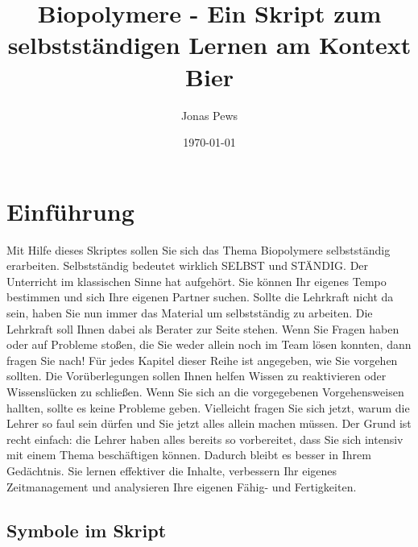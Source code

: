 \documentclass{scrartcl}  %
\author{Jonas Pews}
\title{Biopolymere - Ein Skript zum selbstständigen Lernen am Kontext Bier}
\date{\today}
\begin{document}
	\maketitle
	
	\begin{center}
		\ccbyncsa
	\end{center}
	

\pagebreak

	\renewcommand{\contentsname}{Inhaltsverzeichnis}  %
	\tableofcontents

\pagebreak

	\section{Einführung}

		Mit Hilfe dieses Skriptes sollen Sie sich das Thema Biopolymere selbstständig erarbeiten. Selbstständig bedeutet wirklich SELBST und STÄNDIG. Der Unterricht im klassischen Sinne hat aufgehört. Sie können Ihr eigenes Tempo bestimmen und sich Ihre eigenen Partner suchen. Sollte die Lehrkraft nicht da sein, haben Sie nun immer das Material um selbstständig zu arbeiten.
		Die Lehrkraft soll Ihnen dabei als Berater zur Seite stehen. Wenn Sie Fragen haben oder auf Probleme stoßen, die Sie weder allein noch im Team lösen konnten, dann fragen Sie nach! \newline
		Für jedes Kapitel dieser Reihe ist angegeben, wie Sie vorgehen sollten. Die Vorüberlegungen sollen Ihnen helfen Wissen zu reaktivieren oder Wissenslücken zu schließen. Wenn Sie sich an die vorgegebenen Vorgehensweisen hallten, sollte es keine Probleme geben.
		Vielleicht fragen Sie sich jetzt, warum die Lehrer so faul sein dürfen und Sie jetzt alles allein machen müssen. Der Grund ist recht einfach: die Lehrer haben alles bereits so vorbereitet, dass Sie sich intensiv mit einem Thema beschäftigen können. Dadurch bleibt es besser in Ihrem Gedächtnis. Sie lernen effektiver die Inhalte, verbessern Ihr eigenes Zeitmanagement und analysieren Ihre eigenen Fähig- und Fertigkeiten. \newline

		\subsection{Symbole im Skript}

\end{document}
